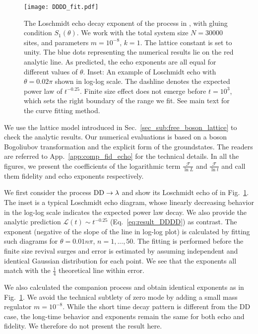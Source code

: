 \begin{figure}[h]
\texttt{[image: DDDD\_fit.pdf]}
\caption{The Loschmidt echo decay exponent of the process in \rev{$\text{DD}\rightarrow \lambda$}{\iffalse \color{red}Eq.~\eqref{eq:DDDD}\fi}, with gluing condition $S_1(\theta)$. We work with the total system size $N = 30000$ sites, and parameters $m = 10^{-8}$, $k = 1$. The lattice constant is set to unity. The blue dots representing the numerical results lie on the red analytic line. As predicted, the echo exponents are all equal for different values of $\theta$. Inset: An example of Loschmidt echo with $\theta = 0.02 \pi$ shown in log-log scale. The dashline denotes the expected power law of $t^{-0.25}$. Finite size effect does not emerge before $t=10^{3}$, which sets the right boundary of the range we fit. See main text for the curve fitting method.}
\label{fig:DDDD}
\end{figure}

We use the lattice model introduced in Sec.~\ref{sec_sub:free_boson_lattice} to check the analytic results. Our numerical evaluations is based on a boson Bogoliubov transformation and the explicit form of the groundstates. The readers are referred to App.~\ref{app:comp_fid_echo} for the technical details. In all the figures, we present the coefficients of the logarithmic term $\frac{\mathcal{F}}{\ln L}$ and $\frac{\mathcal{F} }{\ln t}$ and call them fidelity and echo exponents respectively. 

We first consider the process ${\rm DD} \rightarrow \lambda$
and show its Loschmidt echo of  in Fig.~\ref{fig:DDDD}. The inset is a typical Loschmidt echo diagram, whose linearly decreasing behavior in the log-log scale indicates the expected power law decay. We also provide the analytic prediction $\mathcal{L}(t)\sim t^{-0.25}$ (\cf Eq.~\eqref{eq:result_DDDD}) as contrast. The exponent (negative of the slope of the line in log-log plot) is calculated by fitting such diagrams for $\theta = 0.01n \pi$, $n = 1,...,50 $. The fitting is performed before the finite size revival surges and error is estimated by assuming independent and identical Gaussian distribution for each point. We see that the exponents all match with the $\frac{1}{4}$ theoretical line within error. 

We also calculated the companion process  and obtain identical exponents as in Fig.~\ref{fig:DDDD}. We avoid the technical subtlety of zero mode by adding a small mass regulator $m=10^{-8}$. While the short time decay pattern is different from the DD case, the long-time behavior and exponents remain the same for both echo and fidelity. We therefore do not present the result here. 

